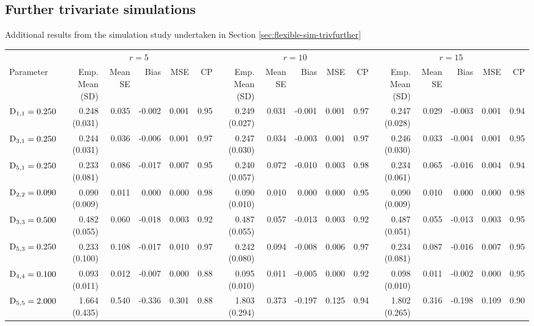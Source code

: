 \thispagestyle{empty}
\begin{landscape}
\subsection{Further trivariate simulations}\label{sec:appendix-GMVJM-FurtherTriv}
Additional results from the simulation study undertaken in Section \ref{sec:flexible-sim-trivfurther}
\begin{table}[ht]
\centering
{}
\captionsetup{font=scriptsize}
\begingroup\scriptsize
\begin{tabular}{l|rrrrr:rrrrr:rrrrr}
  &  &  & \\ 
  Parameter & Emp. Mean (SD) & Mean SE & Bias & MSE & CP & Emp. Mean (SD) & Mean SE & Bias & MSE & CP & Emp. Mean (SD) & Mean SE & Bias & MSE & CP \\ 
  \hline
  $\mathrm{D}_{1,1}= 0.250$ &  0.248 (0.031) & 0.035 & -0.002 & 0.001 & 0.95 &  0.249 (0.027) & 0.031 & -0.001 & 0.001 & 0.97 &  0.247 (0.028) & 0.029 & -0.003 & 0.001 & 0.94 \\ 
  $\mathrm{D}_{3,1}= 0.250$ &  0.244 (0.031) & 0.036 & -0.006 & 0.001 & 0.97 &  0.247 (0.030) & 0.034 & -0.003 & 0.001 & 0.97 &  0.246 (0.030) & 0.033 & -0.004 & 0.001 & 0.95 \\ 
  $\mathrm{D}_{5,1}= 0.250$ &  0.233 (0.081) & 0.086 & -0.017 & 0.007 & 0.95 &  0.240 (0.057) & 0.072 & -0.010 & 0.003 & 0.98 &  0.234 (0.061) & 0.065 & -0.016 & 0.004 & 0.94 \\ 
  $\mathrm{D}_{2,2}= 0.090$ &  0.090 (0.009) & 0.011 &  0.000 & 0.000 & 0.98 &  0.090 (0.010) & 0.010 &  0.000 & 0.000 & 0.95 &  0.090 (0.009) & 0.010 &  0.000 & 0.000 & 0.98 \\ 
  $\mathrm{D}_{3,3}= 0.500$ &  0.482 (0.055) & 0.060 & -0.018 & 0.003 & 0.92 &  0.487 (0.055) & 0.057 & -0.013 & 0.003 & 0.92 &  0.487 (0.051) & 0.055 & -0.013 & 0.003 & 0.95 \\ 
  $\mathrm{D}_{5,3}= 0.250$ &  0.233 (0.100) & 0.108 & -0.017 & 0.010 & 0.97 &  0.242 (0.080) & 0.094 & -0.008 & 0.006 & 0.97 &  0.234 (0.081) & 0.087 & -0.016 & 0.007 & 0.95 \\ 
  $\mathrm{D}_{4,4}= 0.100$ &  0.093 (0.011) & 0.012 & -0.007 & 0.000 & 0.88 &  0.095 (0.010) & 0.011 & -0.005 & 0.000 & 0.92 &  0.098 (0.010) & 0.011 & -0.002 & 0.000 & 0.95 \\ 
  $\mathrm{D}_{5,5}= 2.000$ &  1.664 (0.435) & 0.540 & -0.336 & 0.301 & 0.88 &  1.803 (0.294) & 0.373 & -0.197 & 0.125 & 0.94 &  1.802 (0.265) & 0.316 & -0.198 & 0.109 & 0.90 \\ 

\end{tabular}
\end{table}
\end{landscape}

